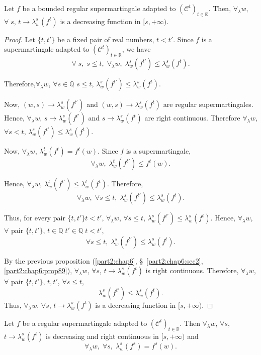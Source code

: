 \begin{proposition}\label{part2:chap6:prop90}
Let $f$ be a  bounded regular supermartingale adapted to
$(\mathscr{C}^t)_{t \in \mathbb{R}}$. Then, $\forall_\lambda w$,
$\forall \; s$, $t \to \lambda^s_w(f^t)$ is a decreasing function in
$[s, + \infty)$. 
\end{proposition}

\begin{proof}
Let $\{t,t'\}$ be a fixed pair of real numbers, $t < t'$. Since $f$ is
a supermartingale adapted to $(\mathscr{C}^t)_{t \in \mathbb{R}}$, we
have 
$$
\forall \; s , \; s \leq t, \; \forall_\lambda w, \;
\lambda^s_w(f^{t'}) \leq \lambda^s_w(f^t). 
$$

Therefore,\pageoriginale $\forall_\lambda w$, $\forall s \in \mathbb{Q}$ $s \leq t$,
$\lambda^s_w(f^{t'}) \leq \lambda^s_w(f^t)$.

Now, $(w,s) \to \lambda^s_w(f^{t'})$ and $(w,s) \to\lambda^s_w(f^t)$
are regular supermartingales. Hence, $\forall_\lambda w$, $s \to
\lambda^s_w (f^{t'})$ and $s\to \lambda^s_w(f^t)$ are right
continuous. Therefore $\forall_\lambda w$, $\forall s < t$,
$\lambda^s_w(f^{t'}) \leq \lambda^s_w(f^t)$. 

Now, $\forall_\lambda w$, $\lambda^t_w(f^t) = f^t(w)$. Since $f$ is a
supermartingale, 
$$
\forall_\lambda w, \; \lambda^t_w(f^{t'}) \leq f^t(w).
$$

Hence, $\forall_\lambda w$, $\lambda^t_w(f^{t'}) \leq
\lambda^t_w(f^t)$. Therefore, 
$$
\forall_\lambda w, \; \forall s \leq t, \; \lambda^s_w(f^{t'}) \leq
\lambda^s_w(f^t). 
$$

Thus, for every pair $\{t, t'\} t < t'$,  $\forall_\lambda w$, $\forall s \leq t$, $\lambda^s_w(f^{t'}) \leq
\lambda^s_w(f^t)$. Hence, $\forall_\lambda w$, $\forall$ pair $\{t,
t'\}$, $t \in \mathbb{Q} \; t' \in \mathbb{Q} \; t < t'$, 
$$
\forall s \leq t, \; \lambda^s_w(f^{t'}) \leq \lambda^s_w(f^t).
$$

By the previous proposition (\ref{part2:chap6},
\S\  \ref{part2:chap6:sec2}, \ref{part2:chap6:prop89}),
$\forall_\lambda w$, 
$\forall s$, $t \to \lambda^s_w(f^t)$ is right continuous. Therefore,
$\forall_\lambda w$, $\forall$ pair $\{t,t'\}$, $t , t'$, $\forall s
\leq t$,
$$
\lambda^s_w(f^{t'}) \leq \lambda^s_w(f^t). 
$$ 
Thus, $\forall_\lambda w$, $\forall s$, $t \to \lambda^s_w(f^t)$ is a
decreasing function in $[s, + \infty)$. 
\end{proof}

\begin{thm}\label{part2:chap6:thm91}
Let $f$ be a regular supermartingale adapted to $(\mathscr{C}^t)_{t
  \in \mathbb{R}}$.  Then $\forall_\lambda w$, $\forall s$, $t \to
\lambda^s_w(f^t)$ is decreasing and right continuous in $[s, +
  \infty)$ and 
$$
\forall_\lambda w, \; \forall s, \; \lambda^s_w (f^s) = f^s(w). 
$$
\end{thm}

